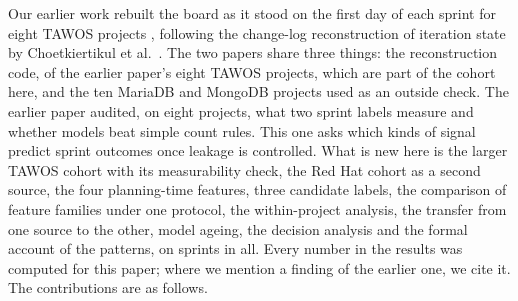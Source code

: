 \documentclass[journal]{IEEEtran}
\begin{document}
Our earlier work \cite{abusharkh2027} rebuilt the board as it stood on the first day of each sprint for eight TAWOS projects \cite{tawos}, following the change-log reconstruction of iteration state by Choetkiertikul et al.\ \cite{choet2018}. The two papers share three things: the reconstruction code, \DevProj{} of the earlier paper's eight TAWOS projects, which are part of the cohort here, and the ten MariaDB and MongoDB projects used as an outside check. The earlier paper audited, on eight projects, what two sprint labels measure and whether models beat simple count rules. This one asks which kinds of signal predict sprint outcomes once leakage is controlled. What is new here is the larger TAWOS cohort with its measurability check, the Red Hat cohort as a second source, the four planning-time features, three candidate labels, the comparison of feature families under one protocol, the within-project analysis, the transfer from one source to the other, model ageing, the decision analysis and the formal account of the patterns, on \BothSprints{} sprints in all. Every number in the results was computed for this paper; where we mention a finding of the earlier one, we cite it. The contributions are as follows.
\end{document}
